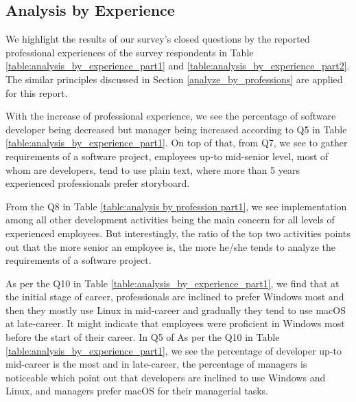 \subsection{Analysis by Experience}

We highlight the results of our survey's closed questions by the reported professional experiences of the survey respondents in Table \ref{table:analysis_by_experience_part1} and \ref{table:analysis_by_experience_part2}. The similar principles discussed in Section \ref{analyze_by_professions} are applied for this report.




With the increase of professional experience, we see the percentage of software developer being decreased but manager being increased according to Q5 in Table \ref{table:analysis_by_experience_part1}. On top of that, from Q7, we see to gather requirements of a software project, employees up-to mid-senior level, most of whom are developers, tend to use plain text, where more than 5 years experienced professionals prefer storyboard.

From the Q8 in Table \ref{table:analysis by profession part1}, we see implementation among all other development activities being the main concern for all levels of experienced employees. But interestingly, the ratio of the top two activities points out that the more senior an employee is, the more he/she tends to analyze the requirements of a software project.

As per the Q10 in Table \ref{table:analysis_by_experience_part1}, we find that at the initial stage of career, professionals are inclined to prefer Windows most and then they mostly use Linux in mid-career and gradually they tend to use macOS at late-career. It might indicate that employees were proficient in Windows most before the start of their career. In Q5 of As per the Q10 in Table \ref{table:analysis_by_experience_part1}, we see the percentage of developer up-to mid-career is the most and in late-career, the percentage of managers is noticeable which point out that developers are inclined to use Windows and Linux, and managers prefer macOS for their managerial tasks.

